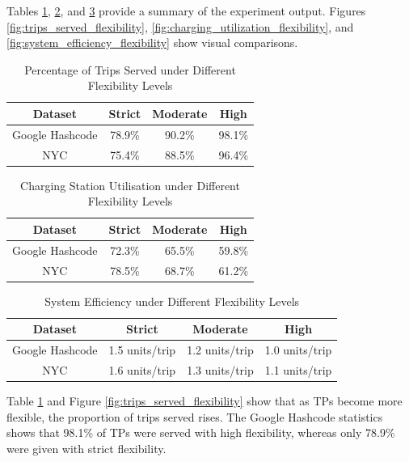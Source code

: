 Tables \ref{tab:trips_served_flexibility}, \ref{tab:charging_utilization_flexibility}, and \ref{tab:system_efficiency_flexibility} provide a summary of the experiment output. Figures \ref{fig:trips_served_flexibility}, \ref{fig:charging_utilization_flexibility}, and \ref{fig:system_efficiency_flexibility} show visual comparisons.

\begin{table}[h]
\caption{Percentage of Trips Served under Different Flexibility Levels}
\centering
\begin{tabular}{|c|c|c|c|}
\hline
\textbf{Dataset} & \textbf{Strict} & \textbf{Moderate } & \textbf{High } \\
\hline
Google Hashcode & 78.9\% & 90.2\% & 98.1\% \\
NYC & 75.4\% & 88.5\% & 96.4\% \\
\hline
\end{tabular}
\label{tab:trips_served_flexibility}
\end{table}

\begin{table}[h]
\caption{Charging Station Utilisation under Different Flexibility Levels}
\centering
\begin{tabular}{|c|c|c|c|}
\hline
\textbf{Dataset} & \textbf{Strict} & \textbf{Moderate} & \textbf{High} \\
\hline
Google Hashcode & 72.3\% & 65.5\% & 59.8\% \\
NYC & 78.5\% & 68.7\% & 61.2\% \\
\hline
\end{tabular}
\label{tab:charging_utilization_flexibility}
\end{table}

\begin{table}[h]
\caption{System Efficiency under Different Flexibility Levels}
\centering
\begin{tabular}{|c|c|c|c|}
\hline
\textbf{Dataset} & \textbf{Strict} & \textbf{Moderate} & \textbf{High} \\
\hline
Google Hashcode & 1.5 units/trip & 1.2 units/trip & 1.0 units/trip \\
NYC & 1.6 units/trip & 1.3 units/trip & 1.1 units/trip \\
\hline
\end{tabular}
\label{tab:system_efficiency_flexibility}
\end{table}

Table \ref{tab:trips_served_flexibility} and Figure \ref{fig:trips_served_flexibility} show that as TPs become more flexible, the proportion of trips served rises. The Google Hashcode statistics shows that 98.1\% of TPs were served with high flexibility, whereas only 78.9\% were given with strict flexibility.

